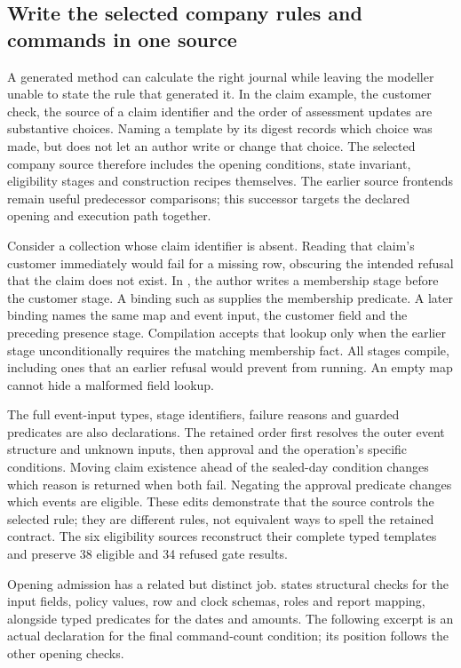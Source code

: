 \subsection{Write the selected company rules and commands in one source}
\label{sec:selected-company-source}

A generated method can calculate the right journal while leaving the modeller
unable to state the rule that generated it. In the claim example, the customer
check, the source of a claim identifier and the order of assessment updates are
substantive choices. Naming a template by its digest records which choice was
made, but does not let an author write or change that choice. The selected
company source therefore includes the opening conditions, state invariant,
eligibility stages and construction recipes themselves. The earlier source
frontends remain useful predecessor comparisons; this successor targets the
declared opening and execution path together.

Consider a collection whose claim identifier is absent. Reading that claim's
customer immediately would fail for a missing row, obscuring the intended
refusal that the claim does not exist. In , the
author writes a membership stage before the customer stage. A binding such as
 supplies the membership
predicate. A later  binding names the same map and event
input, the customer field and the preceding presence stage. Compilation accepts
that lookup only when the earlier stage unconditionally requires the matching
membership fact. All stages compile, including ones that an earlier refusal
would prevent from running. An empty map cannot hide a malformed field lookup.

The full event-input types, stage identifiers, failure reasons and guarded
predicates are also declarations. The retained order first resolves the outer
event structure and unknown inputs, then approval and the operation's specific
conditions. Moving claim existence ahead of the sealed-day condition changes
which reason is returned when both fail. Negating the approval predicate
changes which events are eligible. These edits demonstrate that the source
controls the selected rule; they are different rules, not equivalent ways to
spell the retained contract. The six eligibility sources reconstruct their
complete typed templates and preserve 38 eligible and 34 refused gate results.

Opening admission has a related but distinct job. 
states structural checks for the input fields, policy values, row and clock
schemas, roles and report mapping, alongside typed predicates for the dates
and amounts. The following excerpt is an actual declaration for the final
command-count condition; its position follows the other opening checks.

